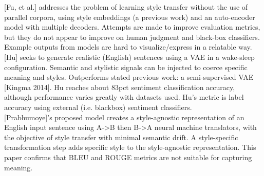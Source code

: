 \documentclass[letterpaper, 10 pt, conference]{ieeeconf}  %
\begin{document}
[Fu, et al.] addresses the problem of learning style transfer without the use of parallel corpora, using style embeddings (a previous work) and an auto-encoder model with multiple decoders. Attempts are made to improve evaluation metrics, but they do not appear to improve on human judgment and black-box classifiers. Example outputs from models are hard to visualize/express in a relatable way.
\\ 

[Hu] seeks to generate realistic (English) sentences using a VAE in a wake-sleep configuration. Semantic and stylistic signals can be injected to coerce specific meaning and styles.
Outperforms stated previous work: a semi-supervised VAE [Kingma 2014]. Hu reaches about 83pct sentiment classification accuracy, although performance varies greatly with datasets used. Hu's metric is label accuracy using external (i.e. blackbox) sentiment classifiers.
\\ 

[Prabhumoye]'s proposed model creates a style-agnostic representation of an English input sentence using A->B then B->A neural machine translators, with the objective of style transfer with minimal semantic drift. A style-specific transformation step adds specific style to the style-agnostic representation. This paper confirms that BLEU and ROUGE metrics are not suitable for capturing meaning.
\end{document}
